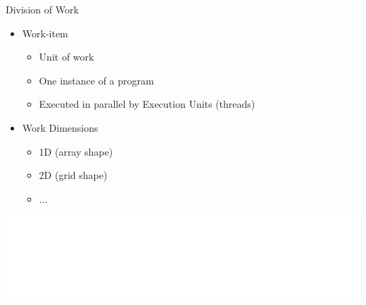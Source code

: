 

\begin{frame}{Division of Work}

\begin{itemize}
    \item Work-item
    \begin{itemize}
        \item Unit of work
        \item One instance of a program
        \item Executed in parallel by Execution Units (threads)
    \end{itemize}
    \item Work Dimensions
    \begin{itemize}
        \item 1D (array shape)
        \item 2D (grid shape)
        \item ...
    \end{itemize}
\end{itemize}

\vspace{1ex}
\hspace{1em}\includegraphics[scale=0.75]{images/work-items.pdf}

\end{frame}


